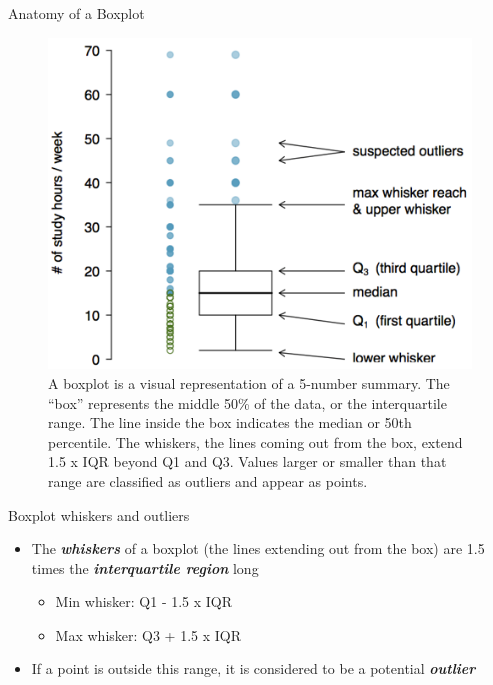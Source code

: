 \documentclass[
  ignorenonframetext,
]{beamer}
\begin{document}
\begin{frame}{Anatomy of a Boxplot}
\label{anatomy-of-a-boxplot}
\begin{figure}[H]

{\centering \includegraphics{class06/boxplot_anatomy.png}

}

\caption{A boxplot is a visual representation of a 5-number summary. The
``box'' represents the middle 50\% of the data, or the interquartile
range. The line inside the box indicates the median or 50th percentile.
The whiskers, the lines coming out from the box, extend 1.5 x IQR beyond
Q1 and Q3. Values larger or smaller than that range are classified as
outliers and appear as points.}

\end{figure}%
\end{frame}

\begin{frame}{Boxplot whiskers and outliers}
\label{boxplot-whiskers-and-outliers}
\begin{itemize}
\item
  The \textbf{\emph{whiskers}} of a boxplot (the lines extending out
  from the box) are 1.5 times the \textbf{\emph{interquartile region}}
  long

  \begin{itemize}
  \item
    Min whisker: Q1 - 1.5 x IQR
  \item
    Max whisker: Q3 + 1.5 x IQR
  \end{itemize}
\item
  If a point is outside this range, it is considered to be a potential
  \textbf{\emph{outlier}}
\end{itemize}
\end{frame}
\end{document}

